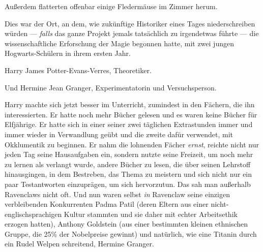 Außerdem flatterten offenbar einige Fledermäuse im Zimmer herum.

Dies war der Ort, an dem, wie zukünftige Historiker eines Tages niederschreiben würden — \emph{falls} das ganze Projekt jemals tatsächlich zu irgendetwas führte — die wissenschaftliche Erforschung der Magie begonnen hatte, mit zwei jungen Hogwarts-Schülern in ihrem ersten Jahr.

Harry James Potter-Evans-Verres, Theoretiker.

Und Hermine Jean Granger, Experimentatorin und Versuchsperson.

Harry machte sich jetzt besser im Unterricht, zumindest in den Fächern, die ihn interessierten. Er hatte noch mehr Bücher gelesen und es waren keine Bücher für Elfjährige. Er hatte sich in einer seiner zwei täglichen Extrastunden immer und immer wieder in Verwandlung geübt und die zweite dafür verwendet, mit Okklumentik zu beginnen. Er nahm die lohnenden Fächer \emph{ernst}, reichte nicht nur jeden Tag seine Hausaufgaben ein, sondern nutzte seine Freizeit, um noch mehr zu lernen als verlangt wurde, andere Bücher zu lesen, die über seinen Lehrstoff hinausgingen, in dem Bestreben, das Thema zu meistern und sich nicht nur ein paar Testantworten einzuprägen, um sich hervorzutun. Das sah man außerhalb Ravenclaws nicht oft. Und nun waren selbst \emph{in} Ravenclaw seine einzigen verbleibenden Konkurrenten Padma Patil (deren Eltern aus einer nicht-englischsprachigen Kultur stammten und sie daher mit echter Arbeitsethik erzogen hatten), Anthony Goldstein (aus einer bestimmten kleinen ethnischen Gruppe, die 25\% der Nobelpreise gewinnt) und natürlich, wie eine Titanin durch ein Rudel Welpen schreitend, Hermine Granger.

